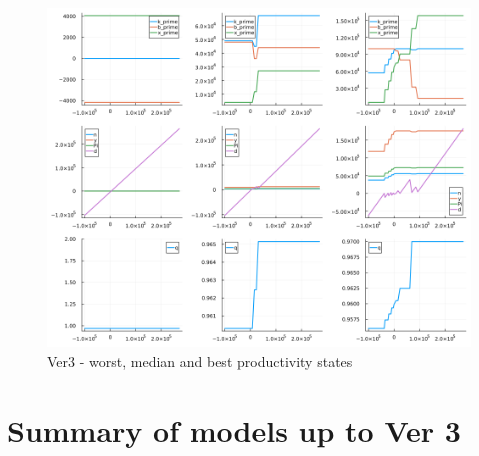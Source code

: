 \documentclass[12pt]{article}
\begin{document}
\begin{figure}[H]  %
    \centering
    \caption{Ver3 - worst, median and best productivity states} \label{chart:CFLcdf}
    \includegraphics[width=1\textwidth]{ver3.png}
\end{figure}


\newpage

\section*{Summary of models up to Ver 3}
\end{document}
